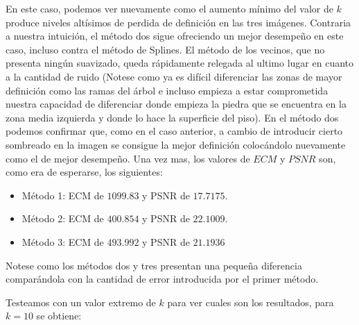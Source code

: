 En este caso, podemos ver nuevamente como el aumento mínimo del valor de $k$ produce niveles altísimos de perdida de definición en las tres imágenes. Contraria a nuestra intuición, el método dos sigue ofreciendo un mejor desempeño en este caso, incluso contra el método de Splines. El método de los vecinos, que no presenta ningún suavizado, queda rápidamente relegada al ultimo lugar en cuanto a la cantidad de ruido (Notese como ya es difícil diferenciar las zonas de mayor definición como las ramas del árbol e incluso empieza a estar comprometida nuestra capacidad de diferenciar donde empieza la piedra que se encuentra en la zona media izquierda y donde lo hace la superficie del piso). En el método dos podemos confirmar que, como en el caso anterior, a cambio de introducir cierto sombreado en la imagen se consigue la mejor definición colocándolo nuevamente como el de mejor desempeño.
Una vez mas, los valores de $ECM$ y $PSNR$ son, como era de esperarse, los siguientes:
\begin{itemize}
 \item Método 1: ECM de $1099.83$ y PSNR de $17.7175$.
 \item Método 2: ECM de $400.854$ y PSNR de $22.1009$.
 \item Método 3: ECM de $493.992$ y PSNR de $21.1936$
\end{itemize}
Notese como los métodos dos y tres presentan una pequeña diferencia comparándola con la cantidad de error introducida por el primer método.

Testeamos con un valor extremo de $k$ para ver cuales son los resultados, para $k=10$ se obtiene:

